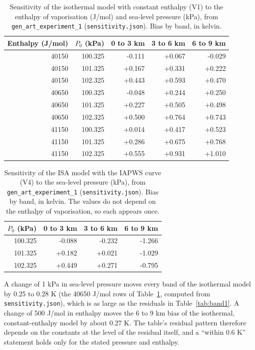 \documentclass[11pt,letterpaper]{article}
\begin{document}
\begin{table}[!htbp]
\centering\small
\caption{Sensitivity of the isothermal model with constant enthalpy (V1) to the enthalpy of vaporisation (J/mol) and sea-level pressure (kPa), from \texttt{gen\_art\_experiment\_1} (\texttt{sensitivity.json}). Bias by band, in kelvin.}\label{tab:sens1}
\begin{tabular}{rrrrr}
\toprule
Enthalpy (J/mol) & $P_0$ (kPa) & 0 to 3 km & 3 to 6 km & 6 to 9 km \\
\midrule
40150 & 100.325 & -0.111 & +0.067 & -0.029 \\
40150 & 101.325 & +0.167 & +0.331 & +0.222 \\
40150 & 102.325 & +0.443 & +0.593 & +0.470 \\
40650 & 100.325 & -0.048 & +0.244 & +0.250 \\
40650 & 101.325 & +0.227 & +0.505 & +0.498 \\
40650 & 102.325 & +0.500 & +0.764 & +0.743 \\
41150 & 100.325 & +0.014 & +0.417 & +0.523 \\
41150 & 101.325 & +0.286 & +0.675 & +0.768 \\
41150 & 102.325 & +0.555 & +0.931 & +1.010 \\
\bottomrule
\end{tabular}
\end{table}

\begin{table}[!htbp]
\centering\small
\caption{Sensitivity of the ISA model with the IAPWS curve (V4) to the sea-level pressure (kPa), from \texttt{gen\_art\_experiment\_1} (\texttt{sensitivity.json}). Bias by band, in kelvin. The values do not depend on the enthalpy of vaporisation, so each appears once.}\label{tab:sens2}
\begin{tabular}{rrrr}
\toprule
$P_0$ (kPa) & 0 to 3 km & 3 to 6 km & 6 to 9 km \\
\midrule
100.325 & -0.088 & -0.232 & -1.266 \\
101.325 & +0.182 & +0.021 & -1.029 \\
102.325 & +0.449 & +0.271 & -0.795 \\
\bottomrule
\end{tabular}
\end{table}

A change of 1 kPa in sea-level pressure moves every band of the isothermal model by 0.25 to 0.28 K (the 40650 J/mol rows of Table~\ref{tab:sens1}, computed from \texttt{sensitivity.json}), which is as large as the residuals in Table~\ref{tab:band1}. A change of 500 J/mol in enthalpy moves the 6 to 9 km bias of the isothermal, constant-enthalpy model by about 0.27 K. The table's residual pattern therefore depends on the constants at the level of the residual itself, and a ``within 0.6 K'' statement holds only for the stated pressure and enthalpy.
\end{document}
